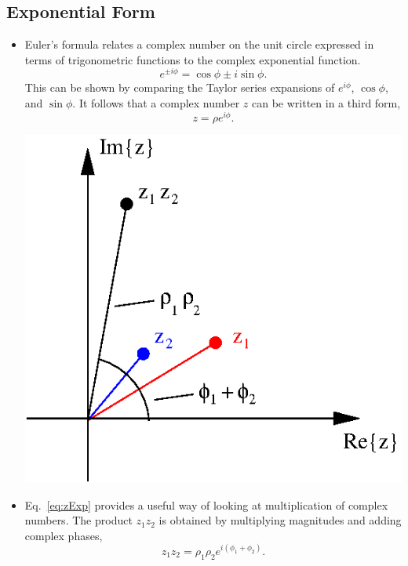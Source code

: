\documentclass[12pt]{article}
\begin{document}
\subsection*{Exponential Form}
\begin{itemize}
\item Euler's formula relates a complex number on the unit circle
  expressed in terms of trigonometric functions to the complex
  exponential function.
  \begin{equation}
    \label{eq:Euler}
    e^{\pm i\phi} = \cos \phi \pm i \sin \phi.
  \end{equation}
  This can be shown by comparing the Taylor series expansions of
  $e^{i\phi}$, $\cos \phi$, and $\sin \phi$. It follows that a complex
  number $z$ can be written in a third form,
  \begin{equation}
    \label{eq:zExp}
    z = \rho e^{i\phi}.
  \end{equation}

  \begin{center}
    \includegraphics{complexMult.eps}
  \end{center}

\item Eq.~\ref{eq:zExp} provides a useful way of looking at
  multiplication of complex numbers. The product $z_1 z_2$ is 
  obtained by multiplying magnitudes and adding complex phases,
  \begin{equation}
    z_1 z_2 = \rho_1 \rho_2 e^{i(\phi_1 + \phi_2)}.
  \end{equation}


\end{itemize}
\end{document}
